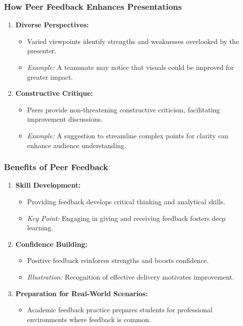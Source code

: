 \documentclass{beamer}
\begin{document}
\begin{frame}[fragile]
    \frametitle{How Peer Feedback Enhances Presentations}
    \begin{enumerate}
        \item \textbf{Diverse Perspectives:}
        \begin{itemize}
            \item Varied viewpoints identify strengths and weaknesses overlooked by the presenter.
            \item \textit{Example:} A teammate may notice that visuals could be improved for greater impact.
        \end{itemize}

        \item \textbf{Constructive Critique:}
        \begin{itemize}
            \item Peers provide non-threatening constructive criticism, facilitating improvement discussions.
            \item \textit{Example:} A suggestion to streamline complex points for clarity can enhance audience understanding.
        \end{itemize}
    \end{enumerate}
\end{frame}

\begin{frame}[fragile]
    \frametitle{Benefits of Peer Feedback}
    \begin{enumerate}[resume]
        \item \textbf{Skill Development:}
        \begin{itemize}
            \item Providing feedback develops critical thinking and analytical skills.
            \item \textit{Key Point:} Engaging in giving and receiving feedback fosters deep learning.
        \end{itemize}

        \item \textbf{Confidence Building:}
        \begin{itemize}
            \item Positive feedback reinforces strengths and boosts confidence.
            \item \textit{Illustration:} Recognition of effective delivery motivates improvement.
        \end{itemize}

        \item \textbf{Preparation for Real-World Scenarios:}
        \begin{itemize}
            \item Academic feedback practice prepares students for professional environments where feedback is common.
        \end{itemize}
    \end{enumerate}
\end{frame}
\end{document}
